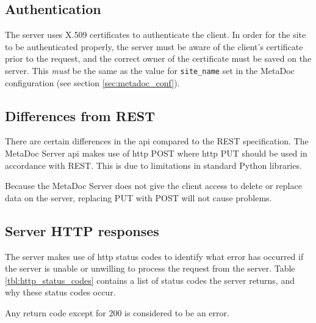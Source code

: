\subsection{Authentication}
\label{sec:authentication}
The server uses X.509 certificates to authenticate the client. In order for the
site to be authenticated properly, the server must be aware of the client's
certificate prior to the request, and the correct owner of the certificate must
be saved on the server. This \textit{must} be the same as the value for
\texttt{site\_name} set in the MetaDoc configuration (see section
\ref{sec:metadoc_conf}).

\subsection{Differences from REST}
\label{sec:diff_from_rest}

There are certain differences in the \gls{api} compared to the REST
specification. The MetaDoc Server \gls{api} makes use of \gls{http} POST where
\gls{http} PUT should be used in accordance with REST. This is due to
limitations in standard Python libraries.

Because the MetaDoc Server does not give the client access to delete or replace
data on the server, replacing PUT with POST will not cause problems.

\subsection{Server HTTP responses}

The server makes use of \gls{http} status codes to identify what error has
occurred if the server is unable or unwilling to process the request from the
server.  Table \ref{tbl:http_status_codes} contains a list of status codes the
server returns, and why these status codes occur. 

Any return code except for 200 is considered to be an error.

